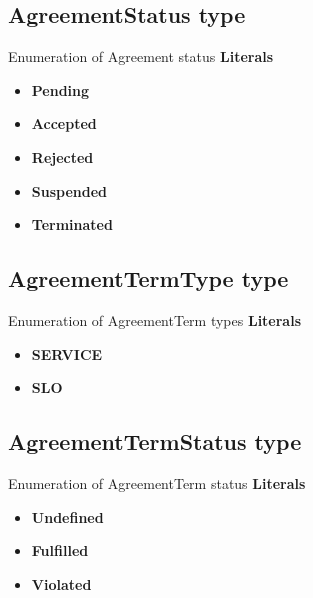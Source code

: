 \documentclass{article}
\begin{document}
\subsection{AgreementStatus type}
Enumeration of Agreement status
\textbf{Literals}
\begin{itemize}
\item \textbf{Pending} 
\end{itemize}
\begin{itemize}
\item \textbf{Accepted} 
\end{itemize}
\begin{itemize}
\item \textbf{Rejected} 
\end{itemize}
\begin{itemize}
\item \textbf{Suspended} 
\end{itemize}
\begin{itemize}
\item \textbf{Terminated} 
\end{itemize}

\subsection{AgreementTermType type}
Enumeration of AgreementTerm types
\textbf{Literals}
\begin{itemize}
\item \textbf{SERVICE} 
\end{itemize}
\begin{itemize}
\item \textbf{SLO} 
\end{itemize}

\subsection{AgreementTermStatus type}
Enumeration of AgreementTerm status
\textbf{Literals}
\begin{itemize}
\item \textbf{Undefined} 
\end{itemize}
\begin{itemize}
\item \textbf{Fulfilled} 
\end{itemize}
\begin{itemize}
\item \textbf{Violated} 
\end{itemize}
\end{document}
